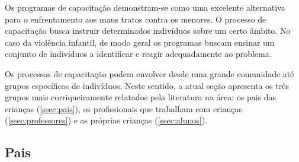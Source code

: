 
Os programas de capacitação demonstram-se como uma excelente alternativa para o enfrentamento aos maus tratos contra os menores. O processo de capacitação busca instruir determinados indivíduos sobre um certo âmbito. No caso da violência infantil, de modo geral os programas buscam ensinar um conjunto de indivíduos a identificar e reagir adequadamente ao problema. 

Os processos de capacitação podem envolver desde uma grande comunidade até grupos específicos de indivíduos. Neste sentido, a atual seção apresenta os três grupos mais corriqueiramente relatados pela literatura na área: os pais das crianças (\autoref{ssec:pais}), os profissionais que trabalham com crianças (\autoref{ssec:professores}) e as próprias crianças (\autoref{ssec:alunos}).




\subsection{Pais}\label{ssec:pais}






